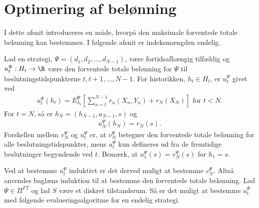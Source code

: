 \section{Optimering af belønning}\label{afsnit:optimering_af_belønning}
I dette afsnit introduceres en måde, hvorpå den maksimale forventede totale belønning kan bestemmes. I følgende afsnit er indeksmængden endelig. 

Lad en strategi, $\Psi = (d_1,d_2, \ldots, d_{N-1})$, være fortidsafhængig tilfældig og $u_t^\Psi: H_t \to \R$ være den forventede totale belønning for $\Psi$ til beslutningstidspunkterne $t, t+1, \ldots, N-1$. For historikken, $h_t \in H_t$, er $u_t^\Psi$ givet ved 
% 
\begin{align}\label{eq:forventede_totale_belønning} 
    u_t^{\Psi}(h_t)=E^{\Psi}_{h_t}\left[\sum^{N-1}_{n=t}r_n(X_n, Y_n)+r_N(X_N)\right] \text{ for } t < N. 
\end{align}
For $t=N$, så er $h_N=(h_{N-1},a_{N-1},s)$ og
\begin{align}\label{eq:u_N=r_N}
    u_N^{\Psi}(h_N)=r_N(s). 
\end{align}
Forskellen mellem $v_N^\Psi$ og $u_t^\Psi$ er, at $v_N^\Psi$ betegner den forventede totale belønning for alle beslutningstidspunkter, mens $u_t^\Psi$ kun defineres ud fra de fremtidige beslutninger begyndende ved $t$. Bemærk, at $u_1^\Psi(s) = v_N^\Psi(s)$ for $h_1 = s$. 


Ved at bestemme $u_t^{\Psi}$ induktivt er det derved muligt at bestemme $v_N^\Psi$. Altså anvendes baglæns induktion til at bestemme den forventede totale belønning. 
Lad $\Psi\in \Pi^{FT}$ og lad $S$ være et diskret tilstandsrum. Så er det muligt at bestemme $u_t^\Psi$ med følgende evalueringsalgoritme for en endelig strategi. %

